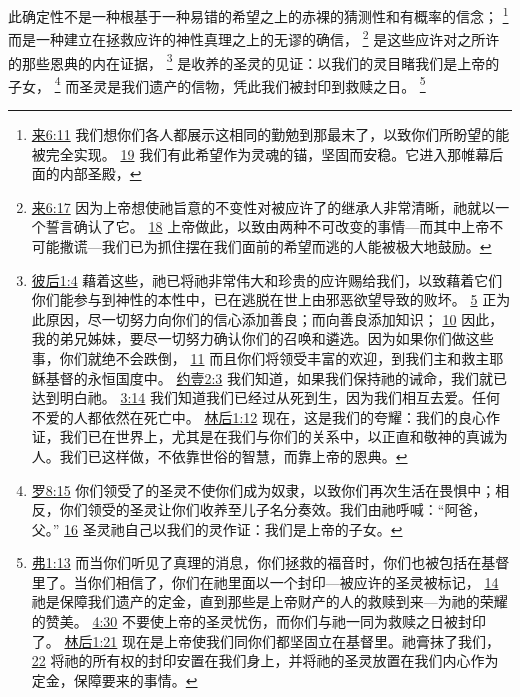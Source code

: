 \documentclass[12pt, a4paper, oneside]{ctexart}
\newcounter{parnum}[section]
\newcommand{\N}{%
   \noindent\refstepcounter{parnum}%
    \makebox[\parindent][l]{\textbf{\arabic{parnum}.}}}
\begin{document}
\N 此确定性不是一种根基于一种易错的希望之上的赤裸的猜测性和有概率的信念；
	\footnote {
		\href{https://biblehub.com/hebrews/6-11.htm}{来6:11} 我们想你们各人都展示这相同的勤勉到那最末了，以致你们所盼望的能被完全实现。
		\href{https://biblehub.com/hebrews/6-19.htm}{19} 我们有此希望作为灵魂的锚，坚固而安稳。它进入那帷幕后面的内部圣殿，
	}
	而是一种建立在拯救应许的神性真理之上的无谬的确信，
	\footnote {
		\href{https://biblehub.com/hebrews/6-17.htm}{来6:17} 因为上帝想使祂旨意的不变性对被应许了的继承人非常清晰，祂就以一个誓言确认了它。
		\href{https://biblehub.com/hebrews/6-18.htm}{18} 上帝做此，以致由两种不可改变的事情---而其中上帝不可能撒谎---我们已为抓住摆在我们面前的希望而逃的人能被极大地鼓励。
	}
	是这些应许对之所许的那些恩典的内在证据，
	\footnote {
		\href{https://biblehub.com/2_peter/1-4.htm}{彼后1:4} 藉着这些，祂已将祂非常伟大和珍贵的应许赐给我们，以致藉着它们你们能参与到神性的本性中，已在逃脱在世上由邪恶欲望导致的败坏。
		\href{https://biblehub.com/2_peter/1-5.htm}{5} 正为此原因，尽一切努力向你们的信心添加善良；而向善良添加知识；
		\href{https://biblehub.com/2_peter/1-10.htm}{10} 因此，我的弟兄姊妹，要尽一切努力确认你们的召唤和遴选。因为如果你们做这些事，你们就绝不会跌倒，
		\href{https://biblehub.com/2_peter/1-11.htm}{11} 而且你们将领受丰富的欢迎，到我们主和救主耶稣基督的永恒国度中。
		\href{https://biblehub.com/1_john/2-3.htm}{约壹2:3} 我们知道，如果我们保持祂的诫命，我们就已达到明白祂。
		\href{https://biblehub.com/1_john/3-14.htm}{3:14} 我们知道我们已经过从死到生，因为我们相互去爱。任何不爱的人都依然在死亡中。
		\href{https://biblehub.com/2_corinthians/1-12.htm}{林后1:12} 现在，这是我们的夸耀：我们的良心作证，我们已在世界上，尤其是在我们与你们的关系中，以正直和敬神的真诚为人。我们已这样做，不依靠世俗的智慧，而靠上帝的恩典。
	}
	是收养的圣灵的见证：以我们的灵目睹我们是上帝的子女，
	\footnote {
		\href{https://biblehub.com/romans/8-15.htm}{罗8:15} 你们领受了的圣灵不使你们成为奴隶，以致你们再次生活在畏惧中；相反，你们领受的圣灵让你们收养至儿子名分奏效。我们由祂呼喊：“阿爸，父。”
		\href{https://biblehub.com/romans/8-16.htm}{16} 圣灵祂自己以我们的灵作证：我们是上帝的子女。
	}
	而圣灵是我们遗产的信物，凭此我们被封印到救赎之日。
	\footnote {
		\href{https://biblehub.com/ephesians/1-13.htm}{弗1:13} 而当你们听见了真理的消息，你们拯救的福音时，你们也被包括在基督里了。当你们相信了，你们在祂里面以一个封印---被应许的圣灵被标记，
		\href{https://biblehub.com/ephesians/1-14.htm}{14} 祂是保障我们遗产的定金，直到那些是上帝财产的人的救赎到来---为祂的荣耀的赞美。
		\href{https://biblehub.com/ephesians/4-30.htm}{4:30} 不要使上帝的圣灵忧伤，而你们与祂一同为救赎之日被封印了。
		\href{https://biblehub.com/2_corinthians/1-21.htm}{林后1:21} 现在是上帝使我们同你们都坚固立在基督里。祂膏抹了我们，
		\href{https://biblehub.com/2_corinthians/1-22.htm}{22} 将祂的所有权的封印安置在我们身上，并将祂的圣灵放置在我们内心作为定金，保障要来的事情。
	}
\end{document}
